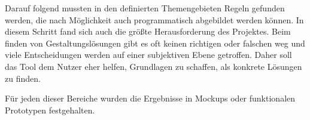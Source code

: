 Darauf folgend mussten in den definierten Themengebieten Regeln gefunden werden, die nach Möglichkeit auch programmatisch abgebildet werden können.
In diesem Schritt fand sich auch die größte Herausforderung des Projektes. Beim finden von Gestaltungslösungen gibt es oft keinen richtigen oder falschen weg und viele Entscheidungen werden auf einer subjektiven Ebene getroffen. Daher soll das Tool dem Nutzer eher helfen, Grundlagen zu schaffen, als konkrete Lösungen zu finden.

Für jeden dieser Bereiche wurden die Ergebnisse in Mockups oder funktionalen Prototypen festgehalten.



\clearpage
